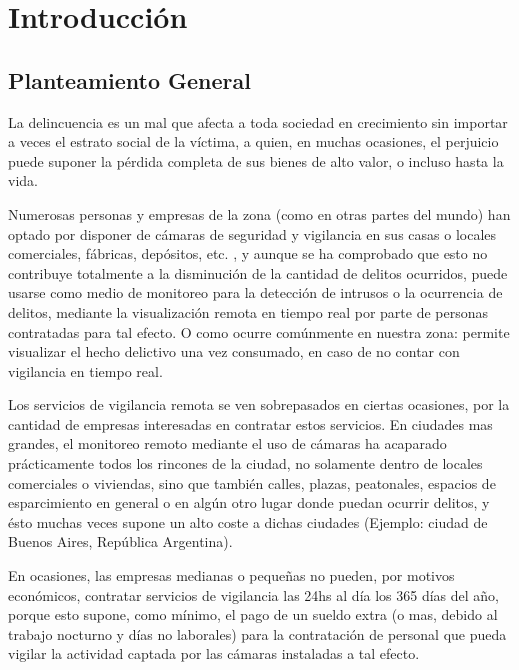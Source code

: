 \documentclass[a4paper,12pt,oneside,spanish]{book}
\begin{document}
\newpage
\tableofcontents

\newpage
\setlength{\parskip}{1.2em}
\chapter{Introducción}
\section{Planteamiento General}
La delincuencia es un mal que afecta a toda sociedad en crecimiento sin importar a veces el estrato social de la víctima, a quien, en muchas ocasiones, el perjuicio puede suponer la pérdida completa de sus bienes de alto valor, o incluso hasta la vida.\par 
 
Numerosas personas y empresas de la zona (como en otras partes del mundo) han optado por disponer de cámaras de seguridad y vigilancia en sus casas o locales comerciales, fábricas, depósitos, etc. , y aunque se ha comprobado que esto no contribuye totalmente a la disminución de la cantidad de delitos ocurridos, puede usarse como medio de monitoreo para la detección de intrusos o la ocurrencia de delitos, mediante la visualización remota en tiempo real por parte de personas contratadas para tal efecto. O como ocurre comúnmente en nuestra zona: permite visualizar el hecho delictivo una vez consumado, en caso de no contar con vigilancia en tiempo real.
\par 

Los servicios de vigilancia remota se ven sobrepasados en ciertas ocasiones, por la cantidad de empresas interesadas en contratar estos servicios. En ciudades mas grandes, el monitoreo remoto mediante el uso de cámaras ha acaparado prácticamente todos los rincones de la ciudad, no solamente dentro de locales comerciales o viviendas, sino que también calles, plazas, peatonales, espacios de esparcimiento en general o en algún otro lugar donde puedan ocurrir delitos, y ésto muchas veces supone un alto coste a dichas ciudades (Ejemplo: ciudad de Buenos Aires, República Argentina).\par 

En ocasiones, las empresas medianas o pequeñas no pueden, por motivos económicos, contratar servicios de vigilancia las 24hs al día los 365 días del año, porque esto supone, como mínimo, el pago de un sueldo extra (o mas, debido al trabajo nocturno y días no laborales) para la contratación de personal que pueda vigilar la actividad captada por las cámaras instaladas a tal efecto.\par
\end{document}
